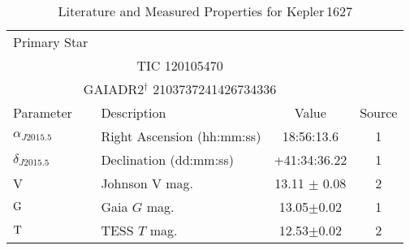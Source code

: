 \begin{table*}
\scriptsize
\setlength{\tabcolsep}{2pt}
\centering
\caption{Literature and Measured Properties for Kepler$\,$1627}
\label{tab:starparams}
\begin{tabular}{llcc}
  \hline
  \hline
Primary Star\dotfill & \\
\multicolumn{3}{c}{TIC 120105470} \\
\multicolumn{3}{c}{GAIADR2$^\dagger$ 2103737241426734336} \\
\hline
\hline
Parameter & Description & Value & Source\\
\hline 
$\alpha_{J2015.5}$\dotfill	&Right Ascension (hh:mm:ss)\dotfill & 18:56:13.6 & 1	\\
$\delta_{J2015.5}$\dotfill	&Declination (dd:mm:ss)\dotfill & +41:34:36.22 & 1	\\
V\dotfill			&Johnson V mag.\dotfill & 13.11 $\pm$ 0.08		& 2	\\
${\rm G}$\dotfill     & Gaia $G$ mag.\dotfill     & 13.05$\pm$0.02 & 1\\
${\rm T}$\dotfill     & TESS $T$ mag.\dotfill     & 12.53$\pm$0.02 & 2\\

\end{tabular}
\end{table*}
